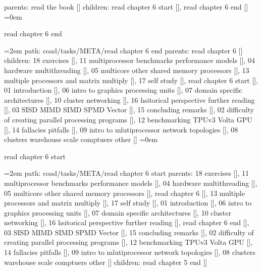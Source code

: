 \smallskip
parents:  read the book []
\smallskip
children: read chapter 6 start [], read chapter 6 end []
\smallskip
\leftskip=0em
\par\endgroup
\bigskip
{}
read chapter 6 end
\smallskip
\par\begingroup
\leftskip=2em
path: coad/tasks/META/read chapter 6 end
\smallskip
parents:  read chapter 6 []
\smallskip
children: 18 exercises [], 11 multiprocessor benchmarks performance models [], 04 hardware multithreading [], 05 multicore other shared memory processors [], 13 multiple processors and matrix multiply [], 17 self study [], read chapter 6 start [], 01 introduction [], 06 intro to graphics processing units [], 07 domain specific architectures [], 10 cluster networking [], 16 hsitorical perspective further reading [], 03 SISD MIMD SIMD SPMD Vector [], 15 concluding remarks [], 02 difficulty of creating parallel processing programs [], 12 benchmarking TPUv3 Volta GPU [], 14 fallacies pitfalls [], 09 intro to mlutiprocessor network topologies [], 08 clusters warehouse scale comptuers other []
\smallskip
\leftskip=0em
\par\endgroup
\bigskip
{}
read chapter 6 start
\smallskip
\par\begingroup
\leftskip=2em
path: coad/tasks/META/read chapter 6 start
\smallskip
parents:  18 exercises [], 11 multiprocessor benchmarks performance models [], 04 hardware multithreading [], 05 multicore other shared memory processors [], read chapter 6 [], 13 multiple processors and matrix multiply [], 17 self study [], 01 introduction [], 06 intro to graphics processing units [], 07 domain specific architectures [], 10 cluster networking [], 16 hsitorical perspective further reading [], read chapter 6 end [], 03 SISD MIMD SIMD SPMD Vector [], 15 concluding remarks [], 02 difficulty of creating parallel processing programs [], 12 benchmarking TPUv3 Volta GPU [], 14 fallacies pitfalls [], 09 intro to mlutiprocessor network topologies [], 08 clusters warehouse scale comptuers other []
\smallskip
children: read chapter 5 end []
\smallskip
